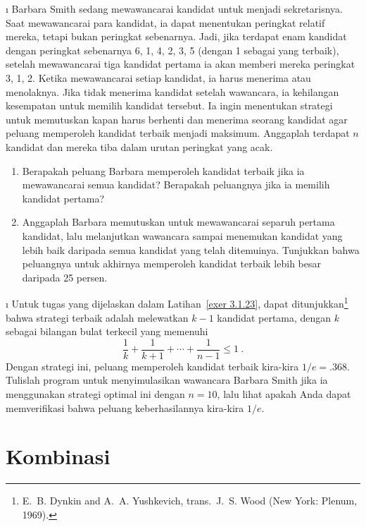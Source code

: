\begin{LJSItem}
\i\label{exer 3.1.23} Barbara Smith sedang mewawancarai kandidat untuk menjadi
sekretarisnya.  Saat mewawancarai para kandidat, ia dapat menentukan peringkat relatif
mereka, tetapi bukan peringkat sebenarnya.  Jadi, jika terdapat enam kandidat dengan
peringkat sebenarnya 6, 1, 4, 2, 3, 5 (dengan 1 sebagai yang terbaik), setelah
mewawancarai tiga kandidat pertama ia akan memberi mereka peringkat 3, 1, 2.  Ketika
mewawancarai setiap kandidat, ia harus menerima atau menolaknya.  Jika tidak menerima
kandidat setelah wawancara, ia kehilangan kesempatan untuk memilih kandidat tersebut.
Ia ingin menentukan strategi untuk memutuskan kapan harus berhenti dan menerima seorang
kandidat agar peluang memperoleh kandidat terbaik menjadi maksimum.  Anggaplah terdapat
$n$ kandidat dan mereka tiba dalam urutan peringkat yang acak.

\begin{enumerate}
\item Berapakah peluang Barbara memperoleh kandidat terbaik jika ia mewawancarai semua
kandidat?  Berapakah peluangnya jika ia memilih kandidat pertama?

\item Anggaplah Barbara memutuskan untuk mewawancarai separuh pertama kandidat, lalu
melanjutkan wawancara sampai menemukan kandidat yang lebih baik daripada semua kandidat
yang telah ditemuinya.  Tunjukkan bahwa peluangnya untuk akhirnya memperoleh kandidat
terbaik lebih besar daripada 25 persen.
\end{enumerate}

\i\label{exer 3.1.24} Untuk tugas yang dijelaskan dalam Latihan~\ref{exer 3.1.23}, dapat
ditunjukkan\footnote{E.~B. Dynkin and A.~A. Yushkevich,  trans.~J.~S. Wood (New York: Plenum, 1969).} bahwa strategi terbaik adalah
melewatkan $k - 1$ kandidat pertama, dengan $k$ sebagai
bilangan bulat terkecil yang memenuhi
$$
\frac 1k + \frac 1{k + 1} + \cdots + \frac 1{n - 1} \leq 1\ .
$$ Dengan strategi ini, peluang memperoleh kandidat terbaik kira-kira $1/e = .368$.
Tulislah program untuk menyimulasikan wawancara Barbara Smith jika ia menggunakan
strategi optimal ini dengan $n = 10$, lalu lihat apakah Anda dapat memverifikasi bahwa
peluang keberhasilannya kira-kira $1/e$.
\end{LJSItem}
\vspace{.25in}

\section{Kombinasi}\label{sec 3.2} 

